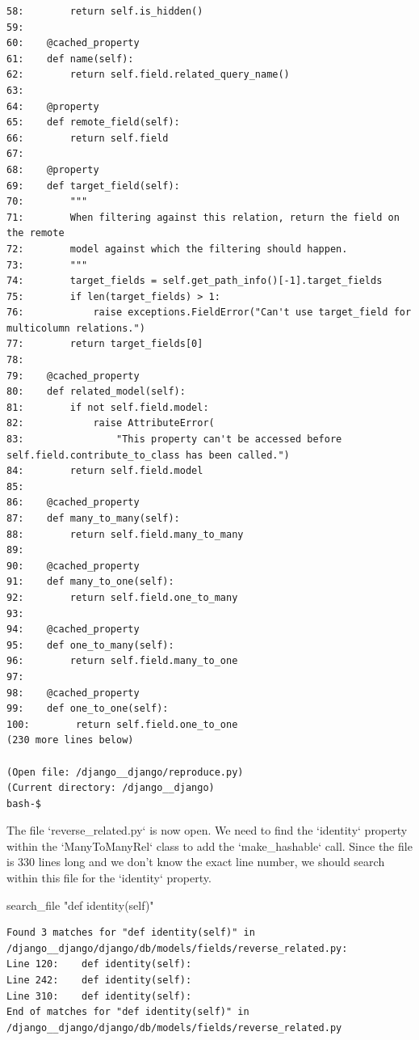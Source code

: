 {\begin{observationbox}
\begin{Verbatim}[breaklines=true, breakanywhere=true]
58:        return self.is_hidden()
59:
60:    @cached_property
61:    def name(self):
62:        return self.field.related_query_name()
63:
64:    @property
65:    def remote_field(self):
66:        return self.field
67:
68:    @property
69:    def target_field(self):
70:        """
71:        When filtering against this relation, return the field on the remote
72:        model against which the filtering should happen.
73:        """
74:        target_fields = self.get_path_info()[-1].target_fields
75:        if len(target_fields) > 1:
76:            raise exceptions.FieldError("Can't use target_field for multicolumn relations.")
77:        return target_fields[0]
78:
79:    @cached_property
80:    def related_model(self):
81:        if not self.field.model:
82:            raise AttributeError(
83:                "This property can't be accessed before self.field.contribute_to_class has been called.")
84:        return self.field.model
85:
86:    @cached_property
87:    def many_to_many(self):
88:        return self.field.many_to_many
89:
90:    @cached_property
91:    def many_to_one(self):
92:        return self.field.one_to_many
93:
94:    @cached_property
95:    def one_to_many(self):
96:        return self.field.many_to_one
97:
98:    @cached_property
99:    def one_to_one(self):
100:        return self.field.one_to_one
(230 more lines below)

(Open file: /django__django/reproduce.py)
(Current directory: /django__django)
bash-$
\end{Verbatim}
\end{observationbox}
\begin{agentbox}
The file `reverse\_related.py` is now open. We need to find the `identity` property within the `ManyToManyRel` class to add the `make\_hashable` call. Since the file is 330 lines long and we don't know the exact line number, we should search within this file for the `identity` property.



\hrulefill
\begin{CodeVerbatim}[breaklines=true, breakanywhere=true]
search_file "def identity(self)"
\end{CodeVerbatim}
\end{agentbox}
\begin{observationbox}\begin{Verbatim}[breaklines=true, breakanywhere=true]
Found 3 matches for "def identity(self)" in /django__django/django/db/models/fields/reverse_related.py:
Line 120:    def identity(self):
Line 242:    def identity(self):
Line 310:    def identity(self):
End of matches for "def identity(self)" in /django__django/django/db/models/fields/reverse_related.py


\end{Verbatim}
\end{observationbox}}

